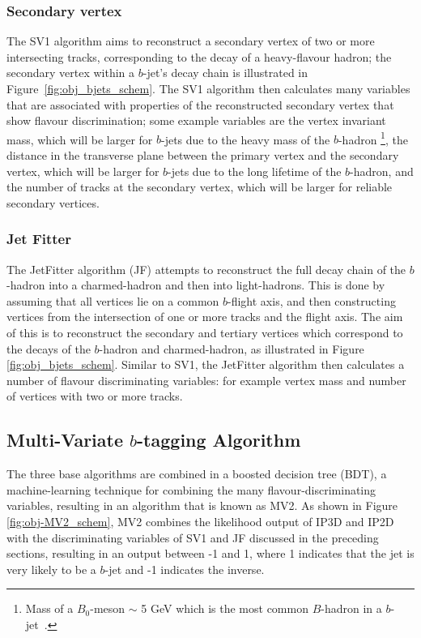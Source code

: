 \subsubsection{Secondary vertex}
\label{sec:obj-bjets_SV}


The SV1 algorithm aims to reconstruct a secondary vertex of two or more intersecting tracks, corresponding to the decay of a heavy-flavour hadron;
the secondary vertex within a $b$-jet's decay chain is illustrated in Figure~\ref{fig:obj_bjets_schem}.
The SV1 algorithm then calculates many variables that are associated with properties of the reconstructed secondary vertex that show flavour discrimination;
some example variables are the vertex invariant mass,
which will be larger for $b$-jets due to the heavy mass of the $b$-hadron
\footnote{Mass of a $B_0$-meson $\sim$ 5 GeV which is the most common $B$-hadron in a $b$-jet~\cite{obj-bjets_PDG}.}, 
the distance in the transverse plane between the primary vertex and the secondary vertex, %
which will be larger for $b$-jets due to the long lifetime of the $b$-hadron,
and the number of tracks at the secondary vertex, which will be larger for reliable secondary vertices.

\subsubsection{Jet Fitter}
\label{sec:obj-bjets_JF}

The JetFitter algorithm (JF) attempts to reconstruct the full decay chain of the $b$-hadron into a charmed-hadron and then into light-hadrons. 
This is done by assuming that all vertices lie on a common $b$-flight axis, and then constructing vertices from the intersection of
one or more tracks and the flight axis.
The aim of this is to reconstruct the secondary and tertiary vertices which correspond to the decays of the $b$-hadron and charmed-hadron,
as illustrated in Figure \ref{fig:obj_bjets_schem}.
Similar to SV1, the JetFitter algorithm then calculates a number of flavour discriminating variables:
for example vertex mass and number of vertices with two or more tracks.

\subsection{Multi-Variate $b$-tagging Algorithm}
\label{sec:obj-bjets_MV2}

The three base algorithms are combined in a boosted decision tree (BDT), a machine-learning technique for combining the many flavour-discriminating variables,
resulting in an algorithm that is known as MV2.
As shown in Figure \ref{fig:obj-MV2_schem}, MV2 combines the likelihood output of IP3D and IP2D
with the discriminating variables of SV1 and JF discussed in the preceding sections,
resulting in an output between -1 and 1, where 1 indicates that the jet is very likely to be a $b$-jet and -1 indicates the inverse.

